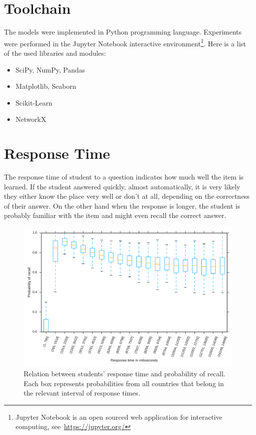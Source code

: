 \section{Toolchain}

The models were implemented in Python programming language. Experiments were performed in the Jupyter Notebook interactive environment\footnote{Jupyter Notebook is an open sourced web application for interactive computing, see~\url{https://jupyter.org/}}. Here is a list of the used libraries and modules:

\begin{itemize}
  \item SciPy, NumPy, Pandas
  \item Matplotlib, Seaborn
  \item Scikit-Learn
  \item NetworkX
\end{itemize}

\section{Response Time}

The response time of student to a question indicates how much well the item is learned. If the student answered quickly, almost automatically, it is very likely they either know the place very well or don't at all, depending on the correctness of their answer. On the other hand when the response is longer, the student is probably familiar with the item and might even recall the correct answer.

\begin{figure}[htbp]
  \centering
  \includegraphics[width=\textwidth]{img/response-time}
  \caption{Relation between students' response time and probability of recall. Each box represents probabilities from all countries that belong in the relevant interval of response times.}
  \label{fig-response-time}
\end{figure}


